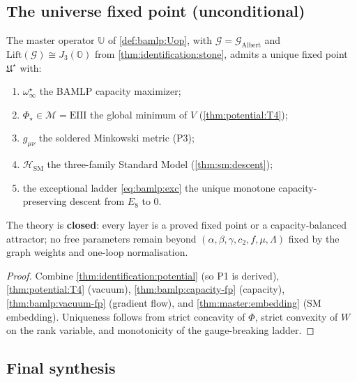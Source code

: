 \subsection{The universe fixed point (unconditional)}
\label{sec:identification:universe}

\begin{theorem}\label{thm:identification:universe}
The master operator $\mathbb{U}$ of \autoref{def:bamlp:Uop}, with
$\mathcal{G}=\mathcal{G}_{\mathrm{Albert}}$ and
$\mathrm{Lift}(\mathcal{G})\cong J_3(\mathbb{O})$ from
\autoref{thm:identification:stone}, admits a unique fixed point
$\mathfrak{U}^\star$ with:
\begin{enumerate}[label=\textup{(\roman*)}]
  \item $\omega^\star_\infty$ the BAMLP capacity maximizer;
  \item $\Phi_\star\in\mathcal{M}=\mathrm{EIII}$ the global minimum of
    $V$ (\autoref{thm:potential:T4});
  \item $g_{\mu\nu}$ the soldered Minkowski metric (P3);
  \item $\mathcal{H}_{\mathrm{SM}}$ the three-family Standard Model
    (\autoref{thm:sm:descent});
  \item the exceptional ladder \eqref{eq:bamlp:exc} the unique monotone
    capacity-preserving descent from $E_8$ to $0$.
\end{enumerate}
The theory is \textbf{closed}: every layer is a proved fixed point or a
capacity-balanced attractor; no free parameters remain beyond
$(\alpha,\beta,\gamma,c_2,f,\mu,\Lambda)$ fixed by the graph weights and
one-loop normalisation.
\end{theorem}

\begin{proof}
Combine \autoref{thm:identification:potential} (so P1 is derived),
\autoref{thm:potential:T4} (vacuum), \autoref{thm:bamlp:capacity-fp}
(capacity), \autoref{thm:bamlp:vacuum-fp} (gradient flow), and
\autoref{thm:master:embedding} (SM embedding). Uniqueness follows from
strict concavity of $\Phi$, strict convexity of $W$ on the rank variable, and
monotonicity of the gauge-breaking ladder.
\end{proof}

\subsection{Final synthesis}
\label{sec:identification:synthesis}

